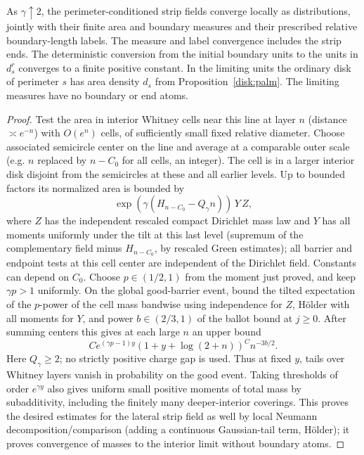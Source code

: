 \begin{lemma}\label{proxy:disk-convergence}
As $\gamma\uparrow2$, the perimeter-conditioned strip fields converge locally as distributions, jointly with their finite area and boundary measures and their prescribed relative boundary-length labels.  The measure and label convergence includes the strip ends.  The deterministic conversion from the initial boundary units to the units in $d_s^r$ converges to a finite positive constant.  In the limiting units the ordinary disk of perimeter $s$ has area density $d_s$ from Proposition~\ref{disk:palm}.  The limiting measures have no boundary or end atoms.
\end{lemma}\begin{proof}

Test the area in interior Whitney cells near this line at layer \(n\) (distance \(\asymp e^{-n}\)) with \(O(e^n)\) cells, of sufficiently small fixed relative diameter.
Choose associated semicircle center on the line and average at a comparable outer scale (e.g. \(n\) replaced by \(n-C_0\) for all cells, an integer).
The cell is in a larger interior disk disjoint from the semicircles at these and all earlier levels.
Up to bounded factors its normalized area is bounded by
\[
 \exp(\gamma(H_{n-C_0}-Q_\gamma n))\,Y\,Z ,
\]
where \(Z\) has the independent rescaled compact Dirichlet mass law and \(Y\) has all moments uniformly under the tilt at this last level (supremum of the complementary field minus \(H_{n-C_0}\), by rescaled Green estimates); all barrier and endpoint tests at this cell center are independent of the Dirichlet field.
Constants can depend on \(C_0\).
Choose \(p\in(1/2,1)\) from the moment just proved, and keep \(\gamma p>1\) uniformly.
On the global good-barrier event, bound the tilted expectation of the \(p\)-power of the cell mass bandwise using independence for \(Z\), Hölder with all moments for \(Y\), and power \(b\in(2/3,1)\) of the ballot bound at \(j\ge0\).
After summing centers this gives at each large \(n\) an upper bound
\[
 C e^{(\gamma p-1)y}(1+y+\log(2+n))^C n^{-3b/2}.
\]
Here \(Q_\gamma\ge2\); no strictly positive charge gap is used.
Thus at fixed \(y\), tails over Whitney layers vanish in probability on the good event.
Taking thresholds of order \(e^{\gamma y}\) also gives uniform small positive moments of total mass by subadditivity, including the finitely many deeper-interior coverings.
This proves the desired estimates for the lateral strip field as well by local Neumann decomposition/comparison (adding a continuous Gaussian-tail term, Hölder); it proves convergence of masses to the interior limit without boundary atoms.


\end{proof}
